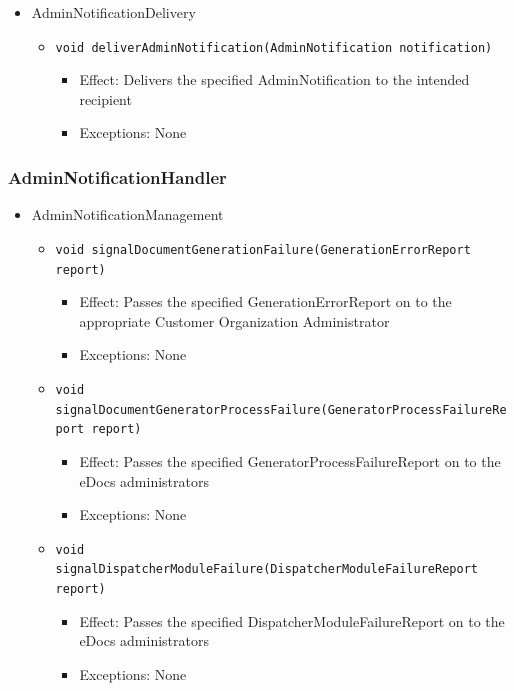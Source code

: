 \documentclass[a4paper,10pt]{article}
\begin{document}
\begin{itemize}
	\item AdminNotificationDelivery
	\begin{itemize}
		\item \texttt{void deliverAdminNotification(AdminNotification notification)}
		\begin{itemize}
			\item Effect: Delivers the specified AdminNotification to the intended recipient
			\item Exceptions: None
		\end{itemize}
	\end{itemize}
\end{itemize}

\subsubsection*{AdminNotificationHandler}
\begin{itemize}
	\item AdminNotificationManagement
	\begin{itemize}
		\item \texttt{void signalDocumentGenerationFailure(GenerationErrorReport report)}
		\begin{itemize}
			\item Effect: Passes the specified GenerationErrorReport on to the appropriate Customer Organization Administrator
			\item Exceptions: None
		\end{itemize}
	\end{itemize}

	\begin{itemize}
		\item \texttt{void signalDocumentGeneratorProcessFailure(GeneratorProcessFailureReport report)}
		\begin{itemize}
			\item Effect: Passes the specified GeneratorProcessFailureReport on to the eDocs administrators
			\item Exceptions: None
		\end{itemize}
	\end{itemize}

	\begin{itemize}
		\item \texttt{void signalDispatcherModuleFailure(DispatcherModuleFailureReport report)}
		\begin{itemize}
			\item Effect: Passes the specified DispatcherModuleFailureReport on to the eDocs administrators
			\item Exceptions: None
		\end{itemize}
	\end{itemize}
\end{itemize}
\end{document}
